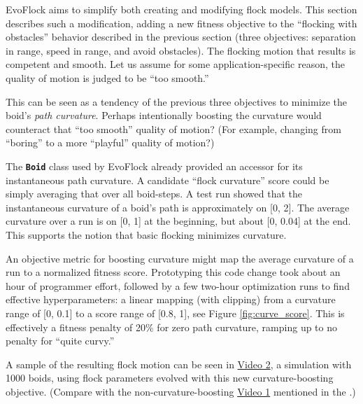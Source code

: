 \documentclass[letterpaper]{article}
\newcommand{\code}[1]{\textbf{\small \texttt{#1}}}
\begin{document}
EvoFlock aims to simplify both creating and modifying flock models. This section describes such a modification, adding a new fitness objective to the ``flocking with obstacles'' behavior described in the previous section (three objectives: separation in range, speed in range, and avoid obstacles). The flocking motion that results is competent and smooth. Let us assume for some application-specific reason, the quality of motion is judged to be ``too smooth.''

This can be seen as a tendency of the previous three objectives to minimize the boid's \textit{path curvature}. Perhaps intentionally boosting the curvature would counteract that ``too smooth'' quality of motion? (For example, changing from ``boring'' to a more ``playful'' quality of motion?)

The \code{Boid} class used by EvoFlock already provided an accessor for its instantaneous path curvature. A candidate ``flock curvature'' score could be simply averaging that over all boid-steps. A test run showed that the instantaneous curvature of a boid's path is approximately on [0, 2]. The average curvature over a run is on [0, 1] at the beginning, but about [0, 0.04] at the end. This supports the notion that basic flocking minimizes curvature.

An objective metric for boosting curvature might map the average curvature of a run to a normalized fitness score. Prototyping this code change took about an hour of programmer effort, followed by a few two-hour optimization runs to find effective hyperparameters: a linear mapping (with clipping) from a curvature range of [0, 0.1] to a score range of [0.8, 1], see Figure \ref{fig:curve_score}. This is effectively a fitness penalty of 20\% for zero path curvature, ramping up to no penalty for ``quite curvy.'' 

A sample of the resulting flock motion can be seen in \href{https://www.youtube.com/watch?v=p8RE0ApsPuw}{Video 2}, a simulation with 1000 boids, using flock parameters evolved with this new curvature-boosting objective. (Compare with the non-curvature-boosting \href{https://youtu.be/XkwJXPJwxIc}{Video 1} mentioned in the .)

\end{document}
